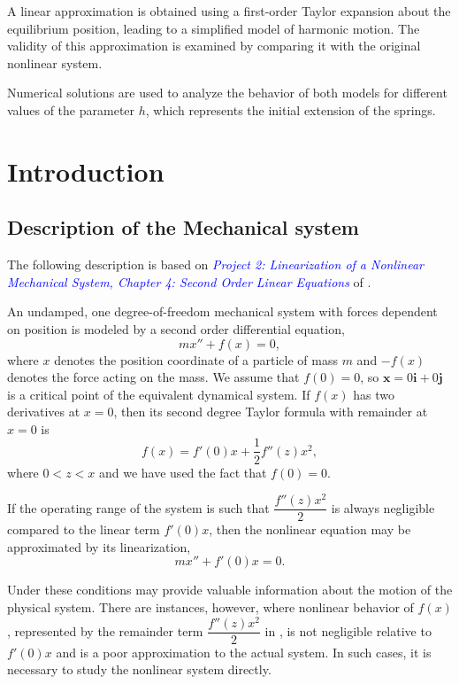 \documentclass[12pt, a4paper]{report}
\renewcommand{\eqref}[1]{\originaleqref{#1}}
\begin{document}
	A linear approximation is obtained using a first-order Taylor expansion about the equilibrium position, leading to a simplified model of harmonic motion. The validity of this approximation is examined by comparing it with the original nonlinear system.
	
	Numerical solutions are used to analyze the behavior of both models for different values of the parameter $h$, which represents the initial extension of the springs.
	
	
	\tableofcontents
	\chapter{Introduction}
	
	\section{Description of the Mechanical system}
	The following description is based on \textit{\textcolor{blue}{Project 2: Linearization of a Nonlinear Mechanical System, Chapter 4: Second Order Linear Equations}} of \cite{mainbook}.
	
	An undamped, one degree-of-freedom mechanical system with forces dependent on position is modeled by a second order differential equation,
	\begin{equation}
		mx'' + f(x) = 0, \label{eq:1}
	\end{equation}
	where $x$ denotes the position coordinate of a particle of mass $m$ and $-f (x)$ denotes the force acting on the mass. We assume that $f(0) = 0$, so $\mathbf{x} = 0\mathbf{i} + 0\mathbf{j}$ is a critical point of the equivalent dynamical system. If $f(x)$ has two derivatives at $x = 0$, then its second degree Taylor formula with remainder at $x = 0$ is
	\begin{equation}
		f(x) = f'(0)x + \frac{1}{2}f''(z)x^2, \label{eq:2}
	\end{equation}
	where $0 < z < x$ and we have used the fact that $f(0) = 0$.
	
	If the operating range of the system is such that $\dfrac{f''(z)x^2}{2}$ is always negligible compared to the linear term $f'(0)x$, then the nonlinear equation \eqref{eq:1} may be approximated by its linearization,
	\begin{equation}
		mx'' + f'(0)x = 0. \label{eq:3}
	\end{equation}
	
	Under these conditions \eqref{eq:1} may provide valuable information about the motion of the physical system. There are instances, however, where nonlinear behavior of $f(x)$, represented by the remainder term $\dfrac{f''(z)x^2}{2}$ in \eqref{eq:2}, is not negligible relative to $f'(0)x$ and \eqref{eq:3} is a poor approximation to the actual system. In such cases, it is necessary to study the nonlinear system directly.
	
\end{document}
